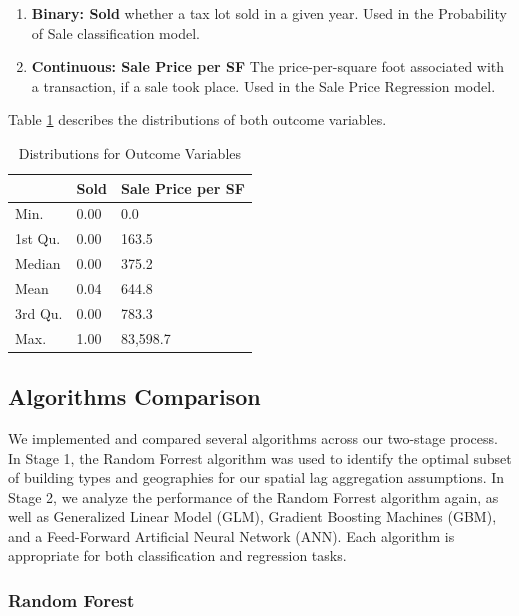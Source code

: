 \documentclass[12pt,]{article}
\providecommand{\tightlist}{%
  \setlength{\itemsep}{0pt}\setlength{\parskip}{0pt}}
\begin{document}
\begin{enumerate}
\def\labelenumi{\arabic{enumi})}
\tightlist
\item
  \textbf{Binary: Sold} whether a tax lot sold in a given year. Used in
  the Probability of Sale classification model.
\item
  \textbf{Continuous: Sale Price per SF} The price-per-square foot
  associated with a transaction, if a sale took place. Used in the Sale
  Price Regression model.
\end{enumerate}

\noindent Table \ref{tab:OutcomeDistro} describes the distributions of
both outcome variables.

\begin{table}

\caption{\label{tab:table 4}\label{tab:OutcomeDistro} Distributions for Outcome Variables}
\centering
\begin{tabular}[t]{lll}
\toprule
  & Sold & Sale Price per SF\\
\midrule
Min. & 0.00 & 0.0\\
1st Qu. & 0.00 & 163.5\\
Median & 0.00 & 375.2\\
Mean & 0.04 & 644.8\\
3rd Qu. & 0.00 & 783.3\\
Max. & 1.00 & 83,598.7\\
\bottomrule
\end{tabular}
\end{table}

\hypertarget{algorithms-comparison}{%
\subsection{Algorithms Comparison}\label{algorithms-comparison}}

We implemented and compared several algorithms across our two-stage
process. In Stage 1, the Random Forrest algorithm was used to identify
the optimal subset of building types and geographies for our spatial lag
aggregation assumptions. In Stage 2, we analyze the performance of the
Random Forrest algorithm again, as well as Generalized Linear Model
(GLM), Gradient Boosting Machines (GBM), and a Feed-Forward Artificial
Neural Network (ANN). Each algorithm is appropriate for both
classification and regression tasks.

\hypertarget{random-forest}{%
\subsubsection{Random Forest}\label{random-forest}}
\end{document}

